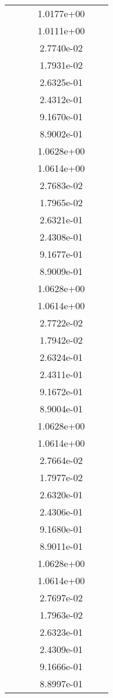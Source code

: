 \begin{xltabular}{\textwidth}{r|rS[table-format=1.3e+2]S[table-format=1.4e+2]S[table-format=1.4e+2]S[table-format=-1.5]}
&  &  & 1.0177e+00 & & \\
&  &  & 1.0111e+00 & & \\
&  &  & 2.7740e-02 & & \\
&  &  & 1.7931e-02 & & \\
&  &  & 2.6325e-01 & & \\
&  &  & 2.4312e-01 & & \\
&  &  & 9.1670e-01 & & \\
&  &  & 8.9002e-01 & & \\
&  &  & 1.0628e+00 & & \\
&  &  & 1.0614e+00 & & \\
&  &  & 2.7683e-02 & & \\
&  &  & 1.7965e-02 & & \\
&  &  & 2.6321e-01 & & \\
&  &  & 2.4308e-01 & & \\
&  &  & 9.1677e-01 & & \\
&  &  & 8.9009e-01 & & \\
&  &  & 1.0628e+00 & & \\
&  &  & 1.0614e+00 & & \\
&  &  & 2.7722e-02 & & \\
&  &  & 1.7942e-02 & & \\
&  &  & 2.6324e-01 & & \\
&  &  & 2.4311e-01 & & \\
&  &  & 9.1672e-01 & & \\
&  &  & 8.9004e-01 & & \\
&  &  & 1.0628e+00 & & \\
&  &  & 1.0614e+00 & & \\
&  &  & 2.7664e-02 & & \\
&  &  & 1.7977e-02 & & \\
&  &  & 2.6320e-01 & & \\
&  &  & 2.4306e-01 & & \\
&  &  & 9.1680e-01 & & \\
&  &  & 8.9011e-01 & & \\
&  &  & 1.0628e+00 & & \\
&  &  & 1.0614e+00 & & \\
&  &  & 2.7697e-02 & & \\
&  &  & 1.7963e-02 & & \\
&  &  & 2.6323e-01 & & \\
&  &  & 2.4309e-01 & & \\
&  &  & 9.1666e-01 & & \\
&  &  & 8.8997e-01 & & \\

\end{xltabular}
